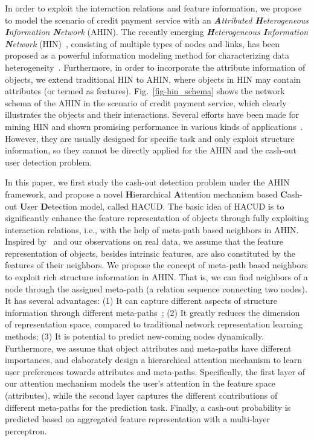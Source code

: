 In order to exploit the interaction relations and feature information, we propose to model the scenario of credit payment service with an \emph{\textbf{A}ttributed \textbf{H}eterogeneous \textbf{I}nformation \textbf{N}etwork} (AHIN). 
The recently emerging \emph{\textbf{H}eterogeneous \textbf{I}nformation \textbf{N}etwork} (HIN)~\citep{shi2017survey}, consisting of multiple types of nodes and links, has been proposed as a powerful information modeling method for characterizing data heterogeneity~\citep{sun2011pathsim,zhao2017meta}. 
Furthermore, in order to incorporate the attribute information of objects, we extend traditional HIN to AHIN, where objects in HIN may contain attributes (or termed as features). 
Fig.~\ref{fig-hin_schema} shows the network schema of the AHIN in the scenario of credit payment service, which clearly illustrates the objects and their interactions. 
Several efforts have been made for mining HIN and shown promising performance in various kinds of applications~\citep{dong2017metapath2vec,sun2012mining,shi2018heterogeneous}.
However, they are usually designed for specific task and only exploit structure information, so they cannot be directly applied for the AHIN and the cash-out user detection problem. 

In this paper, we first study the cash-out detection problem under the AHIN framework, and propose a novel \textbf{H}ierarchical \textbf{A}ttention mechanism based \textbf{C}ash-out \textbf{U}ser \textbf{D}etection model, called HACUD. The basic idea of HACUD is to significantly enhance the feature representation of objects through fully exploiting interaction relations, i.e., with the help of meta-path based neighbors in AHIN. Inspired by~\citep{Kipf2016Semi,zhang2018anrl} and our observations on real data, we assume that the feature representation of objects, besides intrinsic features, are also constituted by the features of their neighbors. We propose the concept of meta-path based neighbors to exploit rich structure information in AHIN. That is, we can find neighbors of a node through the assigned meta-path (a relation sequence connecting two nodes). It has several advantages: (1) It can capture different aspects of structure information through different meta-paths~\citep{han2018aspect}; (2) It greatly reduces the dimension of representation space, compared to traditional network representation learning methods; (3) It is potential to predict new-coming nodes dynamically. Furthermore, we assume that object attributes and meta-paths have different importances, and elaborately design a hierarchical attention mechanism to learn user preferences towards attributes and meta-paths. Specifically,  the first layer of our attention mechanism models the user's attention in the feature space (\ie attributes), while the second layer captures the different contributions of different meta-paths for the prediction task. Finally, a cash-out probability is predicted based on aggregated feature representation with a multi-layer perceptron. 

